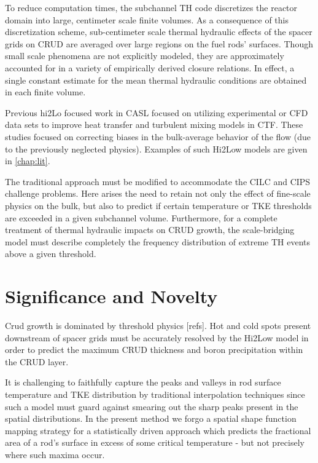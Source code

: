 To reduce computation times, the subchannel TH code discretizes the reactor
domain into large, centimeter scale finite volumes. As a consequence of this
discretization scheme, sub-centimeter scale thermal hydraulic effects of the
spacer grids on CRUD are averaged over large regions on the fuel rods'
surfaces.  Though small scale phenomena are not explicitly modeled, they are
approximately accounted for in a variety of empirically derived closure
relations.  In effect, a single constant estimate for the mean thermal
hydraulic conditions are obtained in each finite volume.

Previous hi2Lo focused work in CASL focused on utilizing experimental or CFD
data sets to improve heat transfer and turbulent mixing models in CTF.  These studies focused on
correcting biases in the bulk-average behavior of the flow (due to the
previously neglected physics).  Examples of such Hi2Low models are given in
\autoref{chap:lit}.

The traditional approach must be modified to accommodate the CILC and CIPS
challenge problems.  Here arises the need to retain not only the effect of
fine-scale physics on the bulk, but also to predict if certain temperature or
TKE thresholds are exceeded in a given subchannel volume.  Furthermore, for a
complete treatment of thermal hydraulic impacts on CRUD growth, the
scale-bridging model must describe completely the frequency distribution of
extreme TH events above a given threshold.


\section{Significance and Novelty}

Crud growth is dominated by threshold physics \cite{mongoose17}[refs].  Hot and cold spots
present downstream of spacer grids must be accurately resolved by the Hi2Low model
in order to predict the maximum CRUD
thickness and boron precipitation within the CRUD layer.  

It is challenging to faithfully capture the peaks and valleys in
rod surface temperature and TKE distribution by traditional interpolation
techniques since such a model must guard against smearing out the sharp peaks
present in the spatial distributions.  
In the present method we forgo a spatial shape function mapping strategy
for a statistically driven approach which predicts the fractional
area of a rod's surface in excess of some critical temperature - but not
precisely where such maxima occur.

